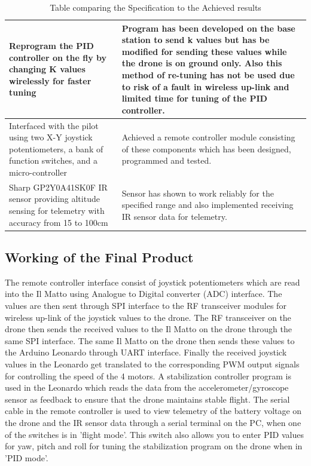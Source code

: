 \documentclass[a4paper,11pt]{article}
\begin{document}
\begin{center}
\begin{table}[!htp]
\begin{tabular}{|m{5cm}|m{8cm}|}
    \hline
    Reprogram the PID controller on the fly by changing K values wirelessly for faster tuning & Program has been developed on the base station to send k values but has be modified for sending these values while the drone is on ground only. Also this method of re-tuning has not be used due to risk of a fault in wireless up-link and limited time for tuning of the PID controller.\\
    \hline
    Interfaced with the pilot using two X-Y joystick potentiometers, a bank of function switches, and a micro-controller & Achieved a remote controller module consisting of these components which has been designed, programmed and tested.\\
    \hline 
    Sharp GP2Y0A41SK0F IR sensor providing altitude sensing for telemetry with accuracy from 15 to 100cm & Sensor has shown to work reliably for the specified range and also implemented receiving IR sensor data for telemetry.\\
    \hline
    \end{tabular}
    \caption{Table comparing the Specification to the Achieved results}
  \end{table}
\end{center}


\newpage
\subsection{Working of the Final Product}
The remote controller interface consist of joystick potentiometers which are read into the Il Matto using Analogue to Digital converter (ADC) interface. The values are then sent through SPI interface to the RF transceiver modules for wireless up-link of the joystick values to the drone. The RF transceiver on the drone then sends the received values to the Il Matto on the drone through the same SPI interface. The same Il Matto on the drone then sends these values to the Arduino Leonardo through UART interface. Finally the received joystick values in the Leonardo get translated to the corresponding PWM output signals for controlling the speed of the 4 motors. A stabilization controller program is used in the Leonardo which reads the data from the accelerometer/gyroscope sensor as feedback to ensure that the drone maintains stable flight. 
The serial cable in the remote controller is used to view telemetry of the battery voltage on the drone and the IR sensor data through a serial terminal on the PC, when one of the switches is in 'flight mode'. This switch also allows you to enter PID values for yaw, pitch and roll for tuning the stabilization program on the drone when in 'PID mode'.
\end{document}
